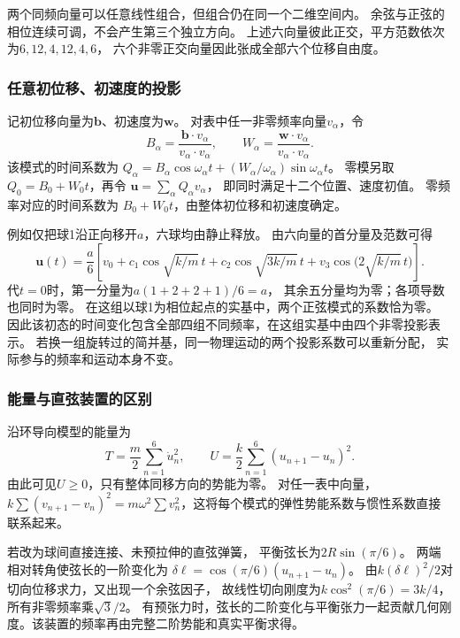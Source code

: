 \documentclass[UTF8,fontset=fandol,a4paper,11pt]{ctexart}
\begin{document}
两个同频向量可以任意线性组合，但组合仍在同一个二维空间内。
余弦与正弦的相位连续可调，不会产生第三个独立方向。
上述六向量彼此正交，平方范数依次为$6,12,4,12,4,6$，
六个非零正交向量因此张成全部六个位移自由度。

\subsubsection*{任意初位移、初速度的投影}
记初位移向量为$\boldsymbol b$、初速度为$\boldsymbol w$。
对表中任一非零频率向量$v_\alpha$，令
\[
B_\alpha=\frac{\boldsymbol b\cdot v_\alpha}{v_\alpha\cdot v_\alpha},
\qquad W_\alpha=\frac{\boldsymbol w\cdot v_\alpha}{v_\alpha\cdot v_\alpha}.
\]
该模式的时间系数为
$Q_\alpha=B_\alpha\cos\omega_\alpha t+
(W_\alpha/\omega_\alpha)\sin\omega_\alpha t$。
零模另取$Q_0=B_0+W_0t$，再令
$\boldsymbol u=\sum_\alpha Q_\alpha v_\alpha$，
即同时满足十二个位置、速度初值。
零频率对应的时间系数为 $B_0+W_0t$，由整体初位移和初速度确定。

例如仅把球1沿正向移开$a$，六球均由静止释放。
由六向量的首分量及范数可得
\[
\boldsymbol u(t)=\frac a6\left[
v_0+c_1\cos\sqrt{k/m}\,t+
c_2\cos\sqrt{3k/m}\,t+
v_3\cos\bigl(2\sqrt{k/m}\,t\bigr)\right].
\]
代$t=0$时，第一分量为$a(1+2+2+1)/6=a$，
其余五分量均为零；各项导数也同时为零。
在这组以球1为相位起点的实基中，两个正弦模式的系数恰为零。
因此该初态的时间变化包含全部四组不同频率，在这组实基中由四个非零投影表示。
若换一组旋转过的简并基，同一物理运动的两个投影系数可以重新分配，
实际参与的频率和运动本身不变。

\subsubsection*{能量与直弦装置的区别}
沿环导向模型的能量为
\[
T=\frac m2\sum_{n=1}^6\dot u_n^2,\qquad
U=\frac k2\sum_{n=1}^6(u_{n+1}-u_n)^2.
\]
由此可见$U\ge0$，只有整体同移方向的势能为零。
对任一表中向量，$k\sum(v_{n+1}-v_n)^2
=m\omega^2\sum v_n^2$，这将每个模式的弹性势能系数与惯性系数直接联系起来。

若改为球间直接连接、未预拉伸的直弦弹簧，
平衡弦长为$2R\sin(\pi/6)$。
两端相对转角使弦长的一阶变化为
$\delta\ell=\cos(\pi/6)(u_{n+1}-u_n)$。
由$k(\delta\ell)^2/2$对切向位移求力，又出现一个余弦因子，
故线性切向刚度为$k\cos^2(\pi/6)=3k/4$，所有非零频率乘$\sqrt3/2$。
有预张力时，弦长的二阶变化与平衡张力一起贡献几何刚度。该装置的频率再由完整二阶势能和真实平衡求得。



\end{document}
